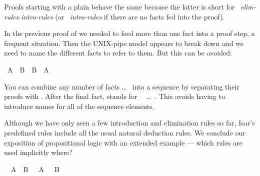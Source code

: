 \begin{isabellebody}
\begin{isamarkuptext}
Proofs starting with a plain  behave the same because the
latter is short for ~\textit{elim-rules
intro-rules}\isa{{\isacharparenright}} (or ~\textit{intro-rules}\isa{{\isacharparenright}} if there are no facts fed into
the proof).%
\end{isamarkuptext}%
\isamarkuptrue%
%
\isamarkuptrue%
%
\begin{isamarkuptext}%
In the previous proof of  we needed to feed
more than one fact into a proof step, a frequent situation. Then the
UNIX-pipe model appears to break down and we need to name the different
facts to refer to them. But this can be avoided:%
\end{isamarkuptext}%
\isamarkuptrue%
\ {\isachardoublequote}A\ {\isasymand}\ B\ {\isasymlongrightarrow}\ B\ {\isasymand}\ A{\isachardoublequote}\isanewline
\isamarkupfalse%
\isamarkupfalse%
\isamarkupfalse%
\isamarkupfalse%
\isamarkupfalse%
\isamarkupfalse%
\isamarkupfalse%
\isamarkupfalse%
\isamarkupfalse%
\isamarkupfalse%
\isamarkupfalse%
\isamarkupfalse%
\isamarkupfalse%
\isamarkupfalse%
%
\begin{isamarkuptext}%
\noindent You can combine any number of facts  \dots\  into a sequence by separating their proofs with
. After the final fact,  stands
for ~~\dots~.  This avoids having to
introduce names for all of the sequence elements.%
\end{isamarkuptext}%
\isamarkuptrue%
%
\begin{isamarkuptext}%
Although we have only seen a few introduction and elimination rules so
far, Isar's predefined rules include all the usual natural deduction
rules. We conclude our exposition of propositional logic with an extended
example --- which rules are used implicitly where?%
\end{isamarkuptext}%
\isamarkuptrue%
\ {\isachardoublequote}{\isasymnot}\ {\isacharparenleft}A\ {\isasymand}\ B{\isacharparenright}\ {\isasymlongrightarrow}\ {\isasymnot}\ A\ {\isasymor}\ {\isasymnot}\ B{\isachardoublequote}\isanewline
\isamarkupfalse%
\isamarkupfalse%
\isamarkupfalse%
\isamarkupfalse%
\isamarkupfalse%
\isamarkupfalse%
\isamarkupfalse%
\isamarkupfalse%
\isamarkupfalse%
\isamarkupfalse%
\isamarkupfalse%
\isamarkupfalse%
\isamarkupfalse%

\end{isabellebody}
